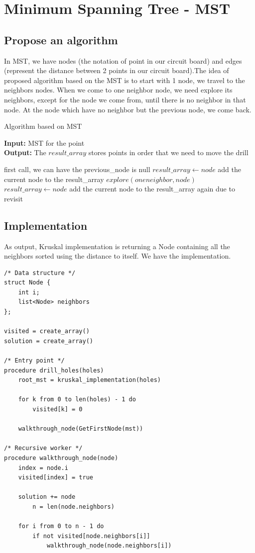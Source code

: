 \documentclass{article}
\begin{document}
\section{Minimum Spanning Tree - MST}

\subsection{Propose an algorithm}
In MST, we have nodes (the notation of point in our circuit board) and edges (represent the distance between 2 points in our circuit board).The idea of proposed algorithm based on the MST is to start with 1 node, we travel to the neighbors nodes. When we come to one neighbor node, we need explore its neighbors, except for the node we come from, until there is no neighbor in that node. At the node which have no neighbor but the previous node, we come back.

\begin{algorithm}[H]
\caption{Algorithm based on MST}
\textbf{Input: }MST for the point\\
\textbf{Output: }The $result\_array$ stores points in order that we need to move the drill
\begin{algorithmic} 
 \Comment first call, we can have the previous\_node is null
\State $result\_array \leftarrow node$  \Comment add the current node to the result\_array
    \State $explore(one neighbor, node)$
\EndWhile
\State $result\_array \leftarrow node$ \Comment add the current node to the result\_array again due to revisit
\EndProcedure
\end{algorithmic}
\end{algorithm}

\subsection{Implementation}

As output, Kruskal implementation is returning a Node containing all the neighbors sorted using the distance to itself. We have the implementation.

\begin{lstlisting}
/* Data structure */
struct Node {
	int i;
	list<Node> neighbors
};

visited = create_array()
solution = create_array()

/* Entry point */
procedure drill_holes(holes)
	root_mst = kruskal_implementation(holes)
	
	for k from 0 to len(holes) - 1 do
		visited[k] = 0

	walkthrough_node(GetFirstNode(mst))

/* Recursive worker */
procedure walkthrough_node(node)
	index = node.i
	visited[index] = true
	
	solution += node
		n = len(node.neighbors)
	
	for i from 0 to n - 1 do
		if not visited[node.neighbors[i]]
			walkthrough_node(node.neighbors[i])
\end{lstlisting}
\end{document}

